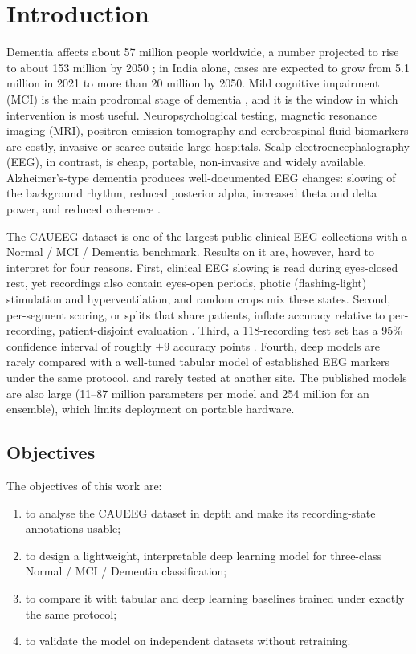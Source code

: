 \section{Introduction}

Dementia affects about 57 million people worldwide, a number projected to rise to about 153 million by 2050
\citep{who2023dementia}; in India alone, cases are expected to grow from 5.1 million in 2021 to more than 20
million by 2050. Mild cognitive impairment (MCI) is the main prodromal stage of dementia \citep{petersen2004mci},
and it is the window in which intervention is most useful. Neuropsychological testing, magnetic resonance
imaging (MRI), positron emission tomography and cerebrospinal fluid biomarkers are costly, invasive or scarce
outside large hospitals. Scalp electroencephalography (EEG), in contrast, is cheap, portable, non-invasive and
widely available. Alzheimer's-type dementia produces well-documented EEG changes: slowing of the background
rhythm, reduced posterior alpha, increased theta and delta power, and reduced coherence
\citep{jeong2004eeg,dauwels2010diagnosis,babiloni2020measures}.

The CAUEEG dataset \citep{kim2023caueeg} is one of the largest public clinical EEG collections with a
Normal / MCI / Dementia benchmark. Results on it are, however, hard to interpret for four reasons. First,
clinical EEG slowing is read during eyes-closed rest, yet recordings also contain eyes-open periods, photic
(flashing-light) stimulation and hyperventilation, and random crops mix these states. Second, per-segment
scoring, or splits that share patients, inflate accuracy relative to per-recording, patient-disjoint
evaluation \citep{saeb2017voice}. Third, a 118-recording test set has a 95\% confidence interval of roughly
$\pm 9$ accuracy points \citep{varoquaux2018cross}. Fourth, deep models are rarely compared with a well-tuned
tabular model of established EEG markers under the same protocol, and rarely tested at another site. The
published models are also large (11--87 million parameters per model and 254 million for an ensemble), which
limits deployment on portable hardware.

\subsection{Objectives}
The objectives of this work are:
\begin{enumerate}[leftmargin=*,itemsep=0pt,topsep=2pt]
\item to analyse the CAUEEG dataset in depth and make its recording-state annotations usable;
\item to design a lightweight, interpretable deep learning model for three-class Normal / MCI / Dementia
      classification;
\item to compare it with tabular and deep learning baselines trained under exactly the same protocol;
\item to validate the model on independent datasets without retraining.
\end{enumerate}

